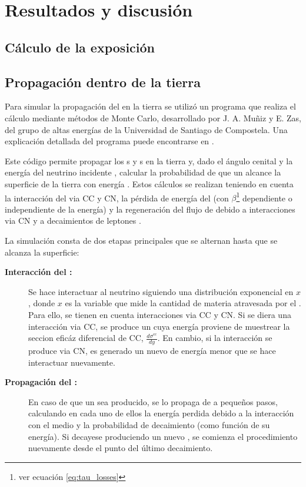 \chapter{Resultados y discusi\'on}
\label{ch:resAuger}

\section{C\'alculo de la exposici\'on}
	
	\section{\label{sc:sim_prop_tierra}Propagaci\'on dentro de la tierra}
	
	Para simular la propagaci\'on del \tauon{} en la tierra se utiliz\'o un programa que realiza el c\'alculo mediante m\'etodos de Monte Carlo, desarrollado por J. A. Mu\~niz y E. Zas, del grupo de altas energ\'ias de la Universidad de Santiago de Compostela.
	Una explicaci\'on detallada del programa puede encontrarse en \cite{gap_tau_tierra}.
	
	Este c\'odigo permite propagar los \nutau{}s y \tauon{}s en la tierra y, dado el \'angulo cenital \tita{} y la energ\'ia del neutrino incidente \enu{}, calcular la probabilidad de que un \tauon{} alcance la superficie de la tierra con energ\'ia \etau{}.
	Estos c\'alculos se realizan teniendo en cuenta la interacci\'on del \nutau{} via CC y CN, la p\'erdida de energ\'ia del \tauon{} (con $\beta$\footnote{ver ecuaci\'on \ref{eq:tau_losses}} dependiente o independiente de la energ\'ia) y la regeneraci\'on del flujo de \nutau{} debido a interacciones via CN y a decaimientos de leptones \tauon{}.
	
	La simulaci\'on consta de dos etapas principales que se alternan hasta que se alcanza la superficie:
	
	\begin{description}
	\item[\textbf{Interacci\'on del \nutau{}:}] Se hace interactuar al neutrino siguiendo una distribuci\'on exponencial en $x$, donde $x$ es la variable que mide la cantidad de materia atravesada por el \nutau{}. Para ello, se tienen en cuenta interacciones via CC y CN. Si se diera una interacci\'on via CC, se produce un \tauon{} cuya energ\'ia proviene de muestrear la seccion efic\'az diferencial de CC, $\frac{d\sigma^{cc}}{dy}$. En cambio, si la interacci\'on se produce via CN, es generado un nuevo \nutau{} de energ\'ia menor que se hace interactuar nuevamente.
	\item[\textbf{Propagaci\'on del \tauon{}:}] En caso de que un \tauon{} sea producido, se lo propaga de a peque\~nos pasos, calculando en cada uno de ellos la energ\'ia perdida debido a la interacci\'on con el medio y la probabilidad de decaimiento (como funci\'on de su energ\'ia). Si decayese produciendo un nuevo \nutau{}, se comienza el procedimiento nuevamente desde el punto del \'ultimo decaimiento.
	\end{description}
	

